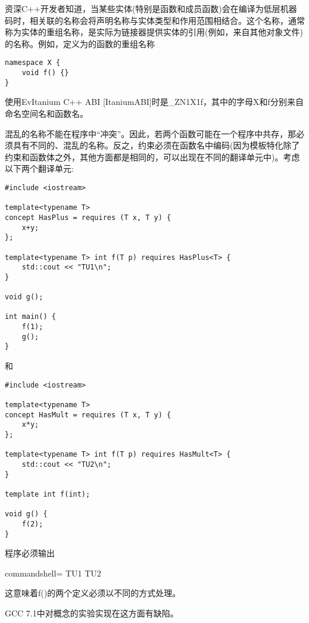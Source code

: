 
资深C++开发者知道，当某些实体(特别是函数和成员函数)会在编译为低层机器码时，相关联的名称会将声明名称与实体类型和作用范围相结合。这个名称，通常称为实体的重组名称，是实际为链接器提供实体的引用(例如，来自其他对象文件)的名称。例如，定义为的函数的重组名称

\begin{lstlisting}[style=styleCXX]
namespace X {
	void f() {}
}
\end{lstlisting}

使用EvItanium C++ ABI [ItaniumABI]时是\_ZN1X1f，其中的字母X和f分别来自命名空间名和函数名。

混乱的名称不能在程序中“冲突”。因此，若两个函数可能在一个程序中共存，那必须具有不同的、混乱的名称。反之，约束必须在函数名中编码(因为模板特化除了约束和函数体之外，其他方面都是相同的，可以出现在不同的翻译单元中)。考虑以下两个翻译单元:

\begin{lstlisting}[style=styleCXX]
#include <iostream>

template<typename T>
concept HasPlus = requires (T x, T y) {
	x+y;
};

template<typename T> int f(T p) requires HasPlus<T> {
	std::cout << "TU1\n";
}

void g();

int main() {
	f(1);
	g();
}
\end{lstlisting}

和

\begin{lstlisting}[style=styleCXX]
#include <iostream>

template<typename T>
concept HasMult = requires (T x, T y) {
	x*y;
};

template<typename T> int f(T p) requires HasMult<T> {
	std::cout << "TU2\n";
}

template int f(int);

void g() {
	f(2);
}
\end{lstlisting}

程序必须输出

\begin{tcblisting}{commandshell={}}
TU1
TU2
\end{tcblisting}

这意味着f()的两个定义必须以不同的方式处理。

\begin{tcolorbox}[colback=webgreen!5!white,colframe=webgreen!75!black]
\hspace*{0.75cm}GCC 7.1中对概念的实验实现在这方面有缺陷。
\end{tcolorbox}























